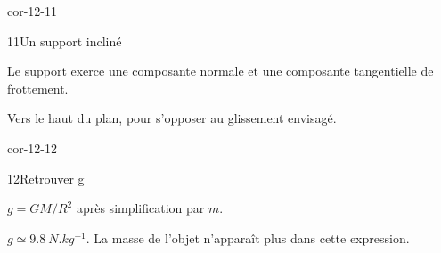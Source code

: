 \begin{blocLivre}{cor-12-11}\begin{corrige}{11}{Un support incliné}
\begin{questions}
\item Le support exerce une composante normale et une composante tangentielle de frottement.
\item Vers le haut du plan, pour s’opposer au glissement envisagé.
\end{questions}
\end{corrige}\end{blocLivre}
\begin{blocLivre}{cor-12-12}\begin{corrige}{12}{Retrouver g}
\begin{questions}
\item $g=GM/R^2$ après simplification par $m$.
\item $g\simeq\qty{9,8}{N.kg^{-1}}$. La masse de l’objet n’apparaît plus dans cette expression.
\end{questions}
\end{corrige}\end{blocLivre}

